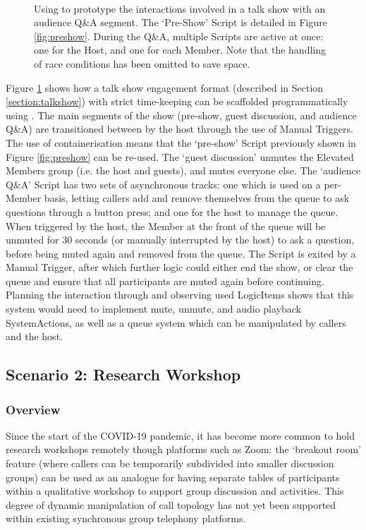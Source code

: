 \begin{figure}[h]
  \caption{Using \ONT{} to prototype the interactions involved in a talk show with an audience Q\&A segment. The `Pre-Show' Script is detailed in Figure \ref{fig:preshow}. During the Q\&A, multiple Scripts are active at once: one for the Host, and one for each Member. Note that the handling of race conditions has been omitted to save space.}~\label{fig:talkshow}
\end{figure}

Figure \ref{fig:talkshow} shows how a talk show engagement format (described in Section \ref{section:talkshow}) with strict time-keeping can be scaffolded programmatically using \ONT{}. The main segments of the show (pre-show, guest discussion, and audience Q\&A) are transitioned between by the host through the use of Manual Triggers. The use of containerisation means that the `pre-show' Script previously shown in Figure \ref{fig:preshow} can be re-used. The `guest discussion' unmutes the Elevated Members group (i.e. the host and guests), and mutes everyone else. The `audience Q\&A' Script has two sets of asynchronous tracks: one which is used on a per-Member basis, letting callers add and remove themselves from the queue to ask questions through a button press; and one for the host to manage the queue. When triggered by the host, the Member at the front of the queue will be unmuted for 30 seconds (or manually interrupted by the host) to ask a question, before being muted again and removed from the queue. The Script is exited by a Manual Trigger, after which further logic could either end the show, or clear the queue and ensure that all participants are muted again before continuing. Planning the interaction through \ONT{} and observing used LogicItems shows that this system would need to implement mute, unmute, and audio playback SystemActions, as well as a queue system which can be manipulated by callers and the host.


\subsection{Scenario 2: Research Workshop}

\subsubsection{Overview}

Since the start of the COVID-19 pandemic, it has become more common to hold research workshops remotely though platforms such as Zoom: the `breakout room' feature (where callers can be temporarily subdivided into smaller discussion groups) can be used as an analogue for having separate tables of participants within a qualitative workshop to support group discussion and activities. This degree of dynamic manipulation of call topology has not yet been supported within existing synchronous group telephony platforms.

